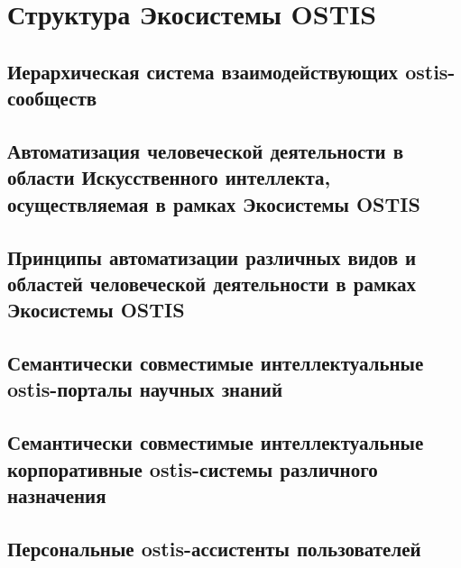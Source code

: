 \chapter{Структура Экосистемы OSTIS}
\label{chapter_ecosystem}


\section{Иерархическая система взаимодействующих ostis-сообществ}
\section{Автоматизация человеческой деятельности в области Искусственного интеллекта, осуществляемая в рамках Экосистемы OSTIS}
\section{Принципы автоматизации различных видов и областей человеческой деятельности в рамках Экосистемы OSTIS}
\section{Семантически совместимые интеллектуальные ostis-порталы научных знаний}
\section{Семантически совместимые интеллектуальные корпоративные ostis-системы различного назначения}
\section{Персональные ostis-ассистенты пользователей}

%